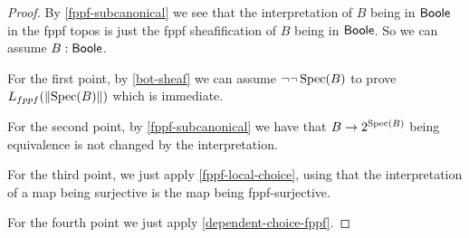 \begin{proof}
By \cref{fppf-subcanonical} we see that the interpretation of $B$ being in $\mathsf{Boole}$ in the fppf topos is just the fppf sheafification of $B$ being in $\mathsf{Boole}$. So we can assume $B:\mathsf{Boole}$.

For the first point, by \cref{bot-sheaf} we can assume $\neg\neg\operatorname{Spec}(B)$ to prove $L_{fppf}(\lVert \operatorname{Spec}(B) \rVert)$ which is immediate.

For the second point, by \cref{fppf-subcanonical} we have that $B\to {2}^{\operatorname{Spec}(B)}$ being equivalence is not changed by the interpretation.

For the third point, we just apply \cref{fppf-local-choice}, using that the interpretation of a map being surjective is the map being fppf-surjective.

For the fourth point we just apply \cref{dependent-choice-fppf}.
\end{proof}

